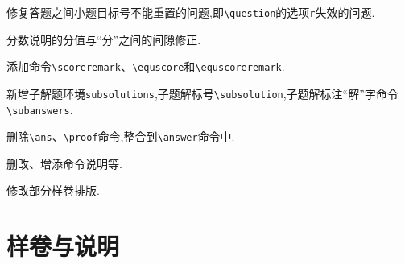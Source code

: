\documentclass[list,answers,csize4,custom]{sysuexam}
\begin{document}
{\par
\begin{compactitem}
    \item 修复答题之间小题目标号不能重置的问题,即\texttt{\backslash{}question}的选项\texttt{r}失效的问题.
    \item 分数说明的分值与``分''之间的间隙修正.
    \item 添加命令\texttt{\backslash{}scoreremark}、\texttt{\backslash{}equscore}和\texttt{\backslash{}equscoreremark}.
    \item 新增子解题环境\texttt{subsolutions},子题解标号\texttt{\backslash{}subsolution},子题解标注``解''字命令\texttt{\backslash{}subanswers}.
    \item 删除\texttt{\backslash{}ans}、\texttt{\backslash{}proof}命令,整合到\texttt{\backslash{}answer}命令中.
    \item 删改、增添命令说明等.
    \item 修改部分样卷排版.
\end{compactitem}
}


\section{样卷与说明}

\end{document}
